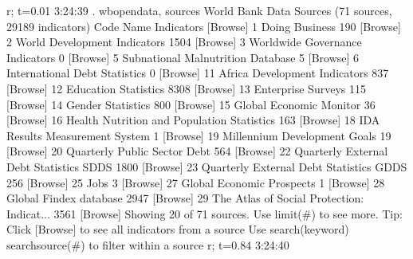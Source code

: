 r; t=0.01 3:24:39
{\smallskip}
. wbopendata, sources
{\smallskip}
World Bank Data Sources (71 sources, 29189 indicators)
  Code  Name                                         Indicators  [Browse]
     1  Doing Business                                      190  [Browse]
     2  World Development Indicators                       1504  [Browse]
     3  Worldwide Governance Indicators                       0  [Browse]
     5  Subnational Malnutrition Database                     5  [Browse]
     6  International Debt Statistics                         0  [Browse]
    11  Africa Development Indicators                       837  [Browse]
    12  Education Statistics                               8308  [Browse]
    13  Enterprise Surveys                                  115  [Browse]
    14  Gender Statistics                                   800  [Browse]
    15  Global Economic Monitor                              36  [Browse]
    16  Health Nutrition and Population Statistics          163  [Browse]
    18  IDA Results Measurement System                        1  [Browse]
    19  Millennium Development Goals                         19  [Browse]
    20  Quarterly Public Sector Debt                        564  [Browse]
    22  Quarterly External Debt Statistics SDDS            1800  [Browse]
    23  Quarterly External Debt Statistics GDDS             256  [Browse]
    25  Jobs                                                  3  [Browse]
    27  Global Economic Prospects                             1  [Browse]
    28  Global Findex database                             2947  [Browse]
    29  The Atlas of Social Protection: Indicat...         3561  [Browse]
Showing 20 of 71 sources. Use limit(\#) to see more.
{\smallskip}
Tip: Click [Browse] to see all indicators from a source
     Use search(keyword) searchsource(\#) to filter within a source
r; t=0.84 3:24:40
